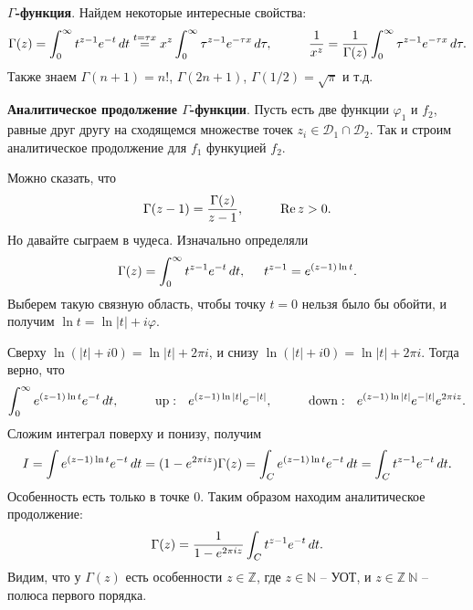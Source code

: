 

\textbf{$\Gamma$-функция}. Найдем некоторые интересные свойства:
\begin{equation*}
    \Gamma(z) = \int_{0}^{\infty} t^{z-1} e^{-t} \d t \overset{t = \tau x}{=} 
    x^z \int_{0}^{\infty} \tau^{z-1} e^{- \tau x} \d \tau,
    \hspace{10 mm} 
    \frac{1}{x^z} = \frac{1}{\Gamma(z)} \int_{0}^{\infty} \tau^{z-1} e^{- \tau x} \d \tau.
\end{equation*}
Также знаем $\Gamma(n+1) = n!$, $\Gamma(2n+1)$, $\Gamma(1/2) = \sqrt{\pi}$ и т.д.



\textbf{Аналитическое продолжение $\Gamma$-функции}. Пусть есть две функции $\varphi_1$ и $f_2$, равные друг другу на сходящемся множестве точек $z_i \in \mathcal D_1 \cap \mathcal D_2$. Так и строим аналитическое продолжение для $f_1$ функуцией $f_2$.


Можно сказать, что 
\begin{equation*}
    \Gamma(z-1) = \frac{\Gamma(z)}{z-1}, \hspace{10 mm} \Re z > 0.
\end{equation*}
Но давайте сыграем в чудеса. Изначально определяли
\begin{equation*}
    \Gamma(z) = \int_{0}^{\infty} t^{z-1} e^{-t} \, d t,
    \hspace{5 mm} 
    t^{z-1} = e^{(z-1) \ln t}.
\end{equation*}
Выберем такую связную область, чтобы точку $t = 0$ нельзя было бы обойти, и получим $\ln t = \ln |t| + i \varphi$. 

Сверху $\ln (|t| + i 0) = \ln |t| + 2 \pi i$, и снизу $\ln (|t| + i 0) = \ln |t| + 2 \pi i$. Тогда верно, что
\begin{equation*}
    \int_{0}^{\infty} e^{(z-1)\ln t} e^{-t} \d t,
    \hspace{10 mm} 
    \text{up}: \ \ e^{(z-1) \ln |t|} e^{-|t|},
    \hspace{10 mm} 
    \text{down}: \ \ e^{(z-1) \ln |t|} e^{-|t|} e^{2 \pi i z}.
\end{equation*}
Сложим интеграл поверху и понизу, получим 
\begin{equation*}
    I = \int e^{(z-1)\ln t} e^{-t} \, d t = (1 -e^{2 \pi i z}) \Gamma(z) 
    = \int_C e^{(z-1) \ln t} e^{- t} \, d t = \int_C t^{z-1} e^{-t} \, d t.
\end{equation*}
Особенность есть только в точке $0$. Таким образом находим аналитическое продолжение:
\begin{equation}
    \Gamma(z) = \frac{1}{1-e^{2 \pi i z}} \int_C t^{z-1} e^{-t} \, d t.
\end{equation}
Видим, что у $\Gamma(z)$ есть особенности $z \in \mathbb{Z}$, где $z \in \mathbb{N}$ -- УОТ, и $z \in \mathbb{Z}\ \mathbb{N}$ -- полюса первого порядка.


